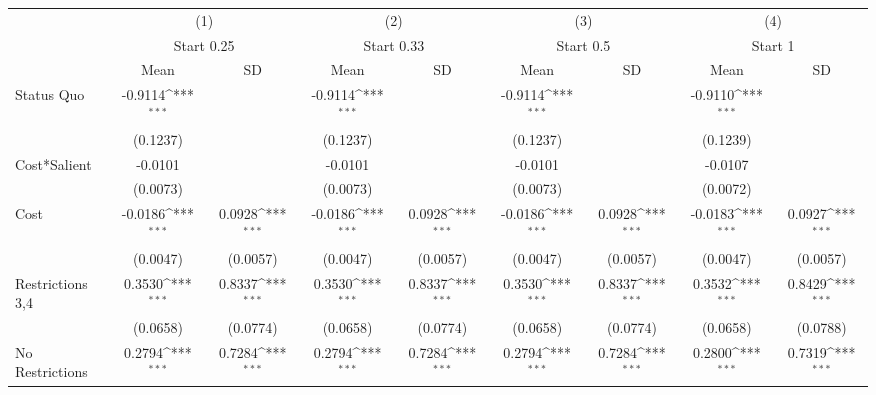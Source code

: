 {
\def\sym#1{\ifmmode^{#1}\else\(^{#1}\)\fi}
\begin{tabular}{l*{8}{c}}
\hline\hline
                &\multicolumn{2}{c}{(1)}              &\multicolumn{2}{c}{(2)}              &\multicolumn{2}{c}{(3)}              &\multicolumn{2}{c}{(4)}              \\
                &\multicolumn{2}{c}{Start 0.25}       &\multicolumn{2}{c}{Start 0.33}       &\multicolumn{2}{c}{Start 0.5}        &\multicolumn{2}{c}{Start 1}          \\
                &     Mean         &       SD         &     Mean         &       SD         &     Mean         &       SD         &     Mean         &       SD         \\
\hline
Status Quo      &  -0.9114\sym{***}&                  &  -0.9114\sym{***}&                  &  -0.9114\sym{***}&                  &  -0.9110\sym{***}&                  \\
                & (0.1237)         &                  & (0.1237)         &                  & (0.1237)         &                  & (0.1239)         &                  \\
Cost*Salient    &  -0.0101         &                  &  -0.0101         &                  &  -0.0101         &                  &  -0.0107         &                  \\
                & (0.0073)         &                  & (0.0073)         &                  & (0.0073)         &                  & (0.0072)         &                  \\
Cost            &  -0.0186\sym{***}&   0.0928\sym{***}&  -0.0186\sym{***}&   0.0928\sym{***}&  -0.0186\sym{***}&   0.0928\sym{***}&  -0.0183\sym{***}&   0.0927\sym{***}\\
                & (0.0047)         & (0.0057)         & (0.0047)         & (0.0057)         & (0.0047)         & (0.0057)         & (0.0047)         & (0.0057)         \\
Restrictions 3,4&   0.3530\sym{***}&   0.8337\sym{***}&   0.3530\sym{***}&   0.8337\sym{***}&   0.3530\sym{***}&   0.8337\sym{***}&   0.3532\sym{***}&   0.8429\sym{***}\\
                & (0.0658)         & (0.0774)         & (0.0658)         & (0.0774)         & (0.0658)         & (0.0774)         & (0.0658)         & (0.0788)         \\
No Restrictions &   0.2794\sym{***}&   0.7284\sym{***}&   0.2794\sym{***}&   0.7284\sym{***}&   0.2794\sym{***}&   0.7284\sym{***}&   0.2800\sym{***}&   0.7319\sym{***}\\

\end{tabular}}
